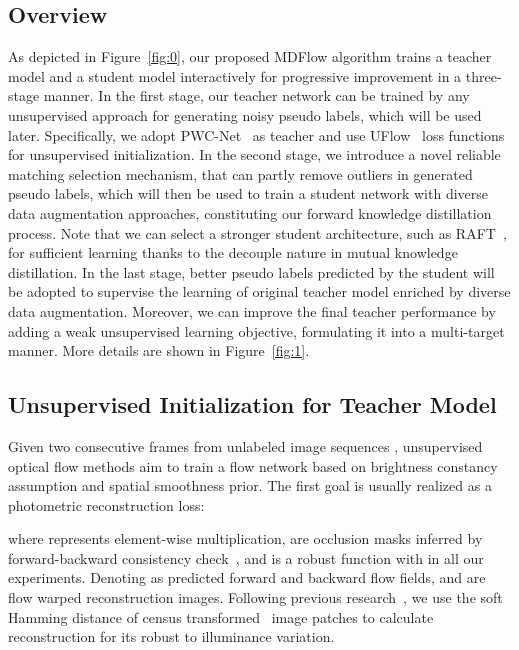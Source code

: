 \documentclass[lettersize,journal]{IEEEtran}
\begin{document}
\subsection{Overview}
As depicted in Figure~\ref{fig:0}, our proposed MDFlow algorithm trains a teacher model  and a student model  interactively for progressive improvement in a three-stage manner. In the first stage, our teacher network can be trained by any unsupervised approach for generating noisy pseudo labels, which will be used later. Specifically, we adopt PWC-Net~\cite{8579029} as teacher and use UFlow~\cite{10.1007/978-3-030-58536-5_33} loss functions for unsupervised initialization. In the second stage, we introduce a novel reliable matching selection mechanism, that can partly remove outliers in generated pseudo labels, which will then be used to train a student network with diverse data augmentation approaches, constituting our forward knowledge distillation process. Note that we can select a stronger student architecture, such as RAFT~\cite{teed2020raft}, for sufficient learning thanks to the decouple nature in mutual knowledge distillation. In the last stage, better pseudo labels predicted by the student will be adopted to supervise the learning of original teacher model enriched by diverse data augmentation. Moreover, we can improve the final teacher performance by adding a weak unsupervised learning objective, formulating it into a multi-target manner. More details are shown in Figure~\ref{fig:1}.

\subsection{Unsupervised Initialization for Teacher Model}
Given two consecutive frames  from unlabeled image sequences , unsupervised optical flow methods aim to train a flow network  based on brightness constancy assumption and spatial smoothness prior. The first goal is usually realized as a photometric reconstruction loss:

where  represents element-wise multiplication,  are occlusion masks inferred by forward-backward consistency check~\cite{10.1007/978-3-642-15549-9_32,Meister:2018:UUL}, and  is a robust function with  in all our experiments. Denoting  as predicted forward and backward flow fields, and  are flow warped reconstruction images. Following previous research~\cite{Liu:2019:DDFlow,10.1007/978-3-030-58536-5_33}, we use the soft Hamming distance of census transformed~\cite{10.1007/BFb0028345} image patches to calculate reconstruction for its robust to illuminance variation.
\end{document}
